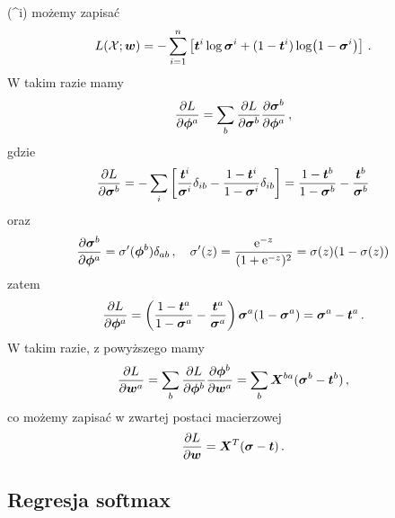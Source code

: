 \documentclass{myclass}
\numberwithin{equation}{subsection}
\begin{document}
\sigma(\bm{\phi}^i)\) możemy zapisać
\[
L(\mathcal{X}; \bm{w}) = - \sum_{i=1}^n \left[ \bm{t}^i \log \bm{\sigma}^i + (1 - \bm{t}^i) \log(1 - \bm{\sigma}^i) \right]\,.
\]
W takim razie mamy
\[
\pdv{L}{\bm{\phi}^a} = \sum_b \pdv{L}{\bm{\sigma}^b} \pdv{\bm{\sigma}^b}{\bm{\phi}^a}\,,
\]
gdzie
\[
\pdv{L}{\bm{\sigma}^b} = -\sum_i \left[\frac{\bm{t}^i}{\bm{\sigma}^i} \delta_{ib} - \frac{1 - \bm{t}^i}{1 - \bm{\sigma}^i} \delta_{ib}\right] = \frac{1 - \bm{t}^b}{1 - \bm{\sigma}^b} - \frac{\bm{t}^b}{\bm{\sigma}^b}
\]
oraz
\[
\pdv{\bm{\sigma}^b}{\bm{\phi}^a} = \sigma'(\bm{\phi}^b) \delta_{ab}\,,\quad \sigma'(z) = \frac{\mathrm{e}^{-z}}{(1 + \mathrm{e}^{-z})^2} = \sigma(z)(1 - \sigma(z))
\]
zatem
\[
\pdv{L}{\bm{\phi}^a} = \left(\frac{1 - \bm{t}^a}{1 - \bm{\sigma}^a} - \frac{\bm{t}^a}{\bm{\sigma}^a}\right)\bm{\sigma}^a(1 - \bm{\sigma}^a) = \bm{\sigma}^a - \bm{t}^a\,.
\]
W takim razie, z powyższego mamy
\[
\pdv{L}{\bm{w}^a} = \sum_b \pdv{L}{\bm{\phi}^b} \pdv{\bm{\phi}^b}{\bm{w}^a} = \sum_b \bm{X}^{ba}(\bm{\sigma}^b - \bm{t}^b)\,,
\]
co możemy zapisać w zwartej postaci macierzowej
\[
\pdv{L}{\bm{w}} = \bm{X}^T (\bm{\sigma} - \bm{t})\,.
\]

\subsection{Regresja softmax}
\end{document}
